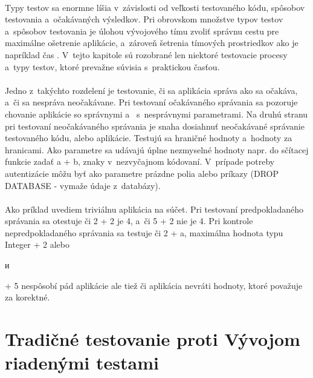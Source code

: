 \documentclass[
  digital, %
  table,   %
oneside,
  nolof,     %
  nolot,     %
]{fithesis3}
\begin{document}
 \paragraph{}
Typy testov sa enormne líšia v~závislosti od veľkosti testovaného kódu, spôsobov testovania a~očakávaných výsledkov. Pri obrovskom množstve typov testov a~spôsobov testovania je úlohou vývojového tímu zvoliť správnu cestu pre maximálne ošetrenie aplikácie, a~zároveň šetrenia tímových prostriedkov ako je napríklad čas \cite{ssl}. V~tejto kapitole sú rozobrané len niektoré testovacie procesy a~typy testov, ktoré prevažne súvisia s~praktickou časťou.\paragraph{}
Jedno z~takýchto rozdelení je  testovanie, či sa aplikácia správa ako sa očakáva, a~či sa nespráva neočakávane. Pri testovaní očakávaného správania sa pozoruje chovanie aplikácie so správnymi a~ s~nesprávnymi parametrami. Na druhú stranu pri testovaní neočakávaného správania je snaha dosiahnuť neočakávané správanie  testovaného kódu, alebo aplikácie. Testujú sa hraničné hodnoty a~hodnoty za hranicami. Ako parametre sa udávajú úplne nezmyselné hodnoty napr. do sčítacej funkcie zadať a + b, znaky v~nezvyčajnom kódovaní. V~prípade potreby autentizácie môžu byť ako parametre prázdne polia alebo príkazy (DROP DATABASE - vymaže údaje z~databázy). \paragraph{}
Ako príklad uvediem triviálnu aplikácia na súčet. Pri testovaní predpokladaného správania sa otestuje či 2 + 2 je 4, a~či 5 + 2 nie je 4. Pri kontrole nepredpokladaného správania sa testuje či 2 + a, maximálna hodnota typu Integer + 2 alebo \begin{otherlanguage}{russian} и \end{otherlanguage}  + 5 nespôsobí pád aplikácie ale tiež či aplikácia nevráti hodnoty, ktoré považuje za korektné. \paragraph{}

\section{Tradičné testovanie proti Vývojom riadenými testami}
\end{document}
